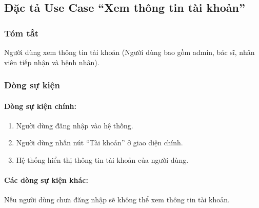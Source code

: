 \subsection{Đặc tả Use Case ``Xem thông tin tài khoản''}

\subsubsection{Tóm tắt}
Người dùng xem thông tin tài khoản (Người dùng bao gồm admin, bác sĩ, nhân viên tiếp nhận và bệnh nhân).

\subsubsection{Dòng sự kiện}
\paragraph{\textbf{Dòng sự kiện chính:}}
\begin{enumerate}
    \item Người dùng đăng nhập vào hệ thống.
    \item Người dùng nhấn nút ``Tài khoản'' ở giao diện chính.
    \item Hệ thống hiển thị thông tin tài khoản của người dùng.
\end{enumerate}

\paragraph{\textbf{Các dòng sự kiện khác:}}
Nếu người dùng chưa đăng nhập sẽ không thể xem thông tin tài khoản.


